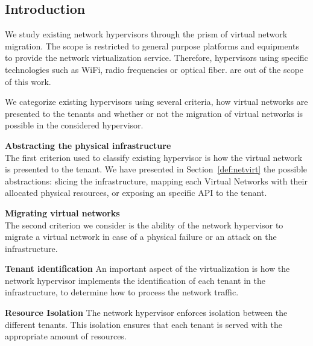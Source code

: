 \subsection{Introduction}
We study existing network hypervisors through the prism of virtual network migration.
The scope is restricted to general purpose platforms and equipments to provide the network virtualization service. Therefore, hypervisors using specific technologies such as WiFi, radio frequencies or optical fiber. are out of the scope of this work.

We categorize existing hypervisors using several criteria, how virtual networks are presented to the tenants and whether or not the migration of virtual networks is possible in the considered hypervisor.

\textbf{Abstracting the physical infrastructure\\}
The first criterion used to classify existing hypervisor is how the virtual network is presented to the tenant. We have presented in Section~\ref{def:netvirt} the possible abstractions: slicing the infrastructure, mapping each Virtual Networks with their allocated physical resources, or exposing an specific API to the tenant.

\textbf{Migrating virtual networks\\}
The second criterion we consider is the ability of the network hypervisor to migrate a virtual network in case of a physical failure or an attack on the infrastructure.

\textbf{Tenant identification}
An important aspect of the virtualization is how the network hypervisor implements the identification of each tenant in the infrastructure, to determine how to process the network traffic.

\textbf{Resource Isolation}
The network hypervisor enforces isolation between the different tenants.
This isolation ensures that each tenant is served with the appropriate amount of resources.

